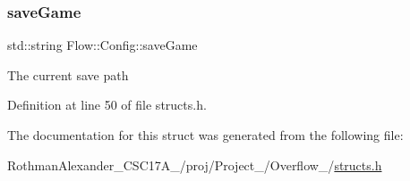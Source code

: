 \subsubsection{\texorpdfstring{save\+Game}{saveGame}}
{\footnotesize\ttfamily std\+::string Flow\+::\+Config\+::save\+Game}

The current save path 

Definition at line 50 of file structs.\+h.



The documentation for this struct was generated from the following file\+:\begin{DoxyCompactItemize}
\item 
Rothman\+Alexander\+\_\+\+C\+S\+C17\+A\+\_/proj/\+Project\+\_/\+Overflow\+\_/\hyperlink{structs_8h}{structs.\+h}\end{DoxyCompactItemize}
